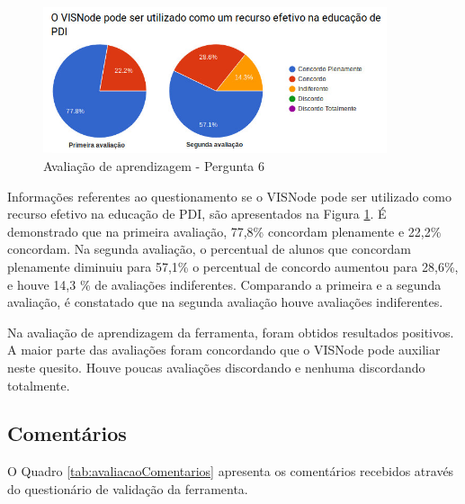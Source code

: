 \documentclass[
	12pt,				%
	oneside,			%
	a4paper,			%
	english,			%
	french,				%
	spanish,			%
	brazil,				%
	]{abntex2}
\begin{document}
\begin{figure}[H]
\centering
\caption{Avaliação de aprendizagem - Pergunta 6}\label{fig:avaliacaoAprendizagem6}
\includegraphics[width=0.9\textwidth]{imagens/avaliacoes/aprendizagem_6.jpg}
\sourceAuthor
\end{figure}

Informações referentes ao questionamento se o VISNode pode ser utilizado como recurso efetivo na educação de PDI, são apresentados na Figura \ref{fig:avaliacaoAprendizagem6}. É demonstrado que na primeira avaliação, 77,8\% concordam plenamente e 22,2\% concordam. Na segunda avaliação, o percentual de alunos que concordam plenamente diminuiu para 57,1\% o percentual de concordo aumentou para 28,6\%, e houve 14,3 \% de avaliações indiferentes. Comparando a primeira e a segunda avaliação, é constatado que na segunda avaliação houve avaliações indiferentes.

Na avaliação de aprendizagem da ferramenta, foram obtidos resultados positivos. A maior parte das avaliações foram concordando que o VISNode pode auxiliar neste quesito. Houve poucas avaliações discordando e nenhuma discordando totalmente.

\subsection{Comentários}

O Quadro \ref{tab:avaliacaoComentarios} apresenta os comentários recebidos através do questionário de validação da ferramenta.
\end{document}
